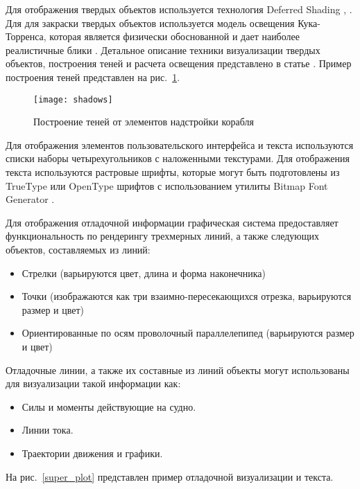 Для отображения твердых объектов используется технология Deferred Shading \citep{stalker}, \citep{killzone}.
Для для закраски твердых объектов используется модель освещения Кука-Торренса, которая является физически обоснованной \citep{cook_torrance} и дает наиболее реалистичные блики \citep{ngan}.
Детальное описание техники визуализации твердых объектов, построения теней и расчета освещения представлено в статье \citep{bezgodov08}.
Пример построения теней представлен на рис.~\ref{shadows}.

\begin{figure}[ht]
\begin{center}
\texttt{[image: shadows]}
\end{center}
\caption{Построение теней от элементов надстройки корабля}
\label{shadows}
\end{figure}



Для отображения элементов пользовательского интерфейса и текста используются списки наборы четырехугольников с наложенными текстурами.
Для отображения текста используются растровые шрифты, которые могут быть подготовлены из TrueType или OpenType шрифтов с использованием утилиты Bitmap Font Generator \citep{bmfont}.

Для отображения отладочной информации графическая система предоставляет функциональность по рендерингу трехмерных линий, 
а также следующих объектов, составляемых из линий:

\begin{itemize}
	\item	Стрелки (варьируются цвет, длина и форма наконечника)
	\item	Точки (изображаются как три взаимно-пересекающихся отрезка, варьируются размер и цвет)
	\item	Ориентированные по осям проволочный параллелепипед (варьируются размер и цвет)
\end{itemize}

Отладочные линии, а также их составные из линий объекты могут использованы для визуализации такой информации как:
\begin{itemize}
	\item	Силы и моменты действующие на судно.
	\item	Линии тока.
	\item	Траектории движения и графики.
\end{itemize}

На рис.~\ref{super_plot} представлен пример отладочной визуализации и текста.

